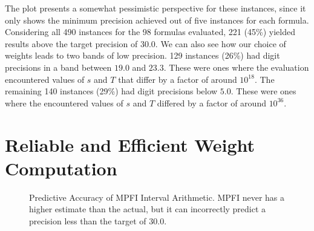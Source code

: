 \documentclass[letterpaper,USenglish,cleveref, autoref, thm-restate]{lipics-v2021}
\begin{document}
The plot presents a somewhat pessimistic
perspective for these instances, since it only shows the minimum
precision achieved out of five instances for each formula.  Considering all 490 instances
for the 98 formulas evaluated, 221 (45\%) yielded results above the
target precision of $30.0$.  We can also see how our choice of weights
leads to two bands of low precision.  129 instances (26\%) had digit
precisions in a band between $19.0$ and $23.3$.  These were ones where
the evaluation encountered values of $s$ and $T$ that
differ by a factor of around $10^{18}$.  The remaining 140 instances
(29\%) had digit precisions below $5.0$.  These were ones where the
encountered values of $s$ and $T$ differed by a factor of around
 $10^{36}$.

\section{Reliable and Efficient Weight Computation}

\begin{figure}
\caption{Predictive Accuracy of MPFI Interval Arithmetic.  MPFI never has a higher estimate than the actual, but it can
incorrectly predict a precision less than the target of 30.0.}
\label{fig:mpfi}
\end{figure}
\end{document}
